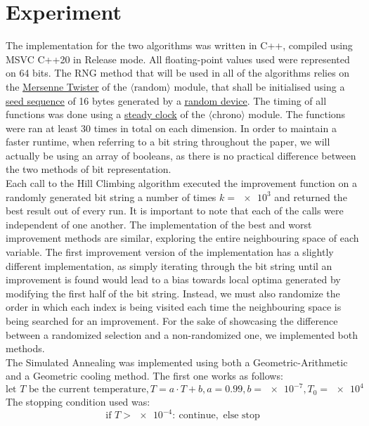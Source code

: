 \documentclass{article}
\begin{document}
\section{Experiment}
The implementation for the two algorithms was written in C++, compiled using MSVC C++20 in Release mode. All floating-point values used were represented on 64 bits. The RNG method that will be used in all of the algorithms relies on the \underline{\href{https://cplusplus.com/reference/random/mt19937/}{Mersenne Twister}} of the $\langle\text{random}\rangle$ module, that shall be initialised using a \underline{\href{https://en.cppreference.com/w/cpp/numeric/random/seed_seq}{seed sequence}} of 16 bytes generated by a \underline{\href{https://en.cppreference.com/w/cpp/numeric/random/random_device}{random device}}. The timing of all functions was done using a \underline{\href{https://en.cppreference.com/w/cpp/chrono/steady_clock}{steady clock}} of the $\langle\text{chrono}\rangle$ module. The functions were ran at least 30 times in total on each dimension. In order to maintain a faster runtime, when referring to a bit string throughout the paper, we will actually be using an array of booleans, as there is no practical difference between the two methods of bit representation.\\
Each call to the Hill Climbing algorithm executed the improvement function on a randomly generated bit string a number of times $k = \num{e3}$ and returned the best result out of every run. It is important to note that each of the calls were independent of one another. The implementation of the best and worst improvement methods are similar, exploring the entire neighbouring space of each variable. The first improvement version of the implementation has a slightly different implementation, as simply iterating through the bit string until an improvement is found would lead to a bias towards local optima generated by modifying the first half of the bit string. Instead, we must also randomize the order in which each index is being visited each time the neighbouring space is being searched for an improvement. For the sake of showcasing the difference between a randomized selection and a non-randomized one, we implemented both methods.\\
The Simulated Annealing was implemented using both a Geometric-Arithmetic and a Geometric cooling method. The first one works as follows:
$$ \text{let } T \text{ be the current temperature}, T = a \cdot T + b, a = 0.99, b = \num{e-7}, T_0 = \num{e4} $$
The stopping condition used was:
$$ \text{if } T > \num{e-4}\colon\  \text{continue}, \text{ else stop} $$
\end{document}
